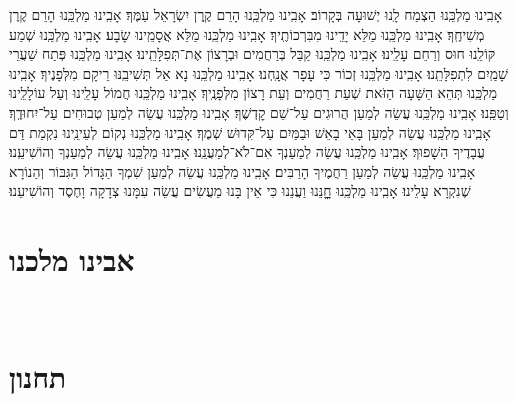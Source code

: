 \documentclass[twoside, openany, parskip=half, 11pt]{book}
\begin{document}
{אָבִֽינוּ מַלְכֵּֽנוּ הַצְמַח לָֽנוּ יְשׁוּעָה בְּקָרוֹב׃\hfill \break
אָבִֽינוּ מַלְכֵּֽנוּ הָרֵם קֶֽרֶן יִשְׂרָאֵל עַמֶּךָ׃\hfill \break
אָבִֽינוּ מַלְכֵּֽנוּ הָרֵם קֶרֶן מְשִׁיחֶֽךָ׃\hfill \break
אָבִֽינוּ מַלְכֵּֽנוּ מַלֵּא יָדֵֽינוּ מִבִּרְכוֹתֶֽיךָ׃\hfill \break
אָבִֽינוּ מַלְכֵּֽנוּ מַלֵּא אֲסָמֵֽינוּ שָׂבָע׃\hfill \break
אָבִֽינוּ מַלְכֵּֽנוּ שְׁמַע קּוֹלֵֽנוּ חוּס וְרַחֵם עָלֵֽינוּ׃\hfill \break
אָבִֽינוּ מַלְכֵּֽנוּ קַבֵּל בְּרַחֲמִים וּבְרָצוֹן אֶת־תְּפִלָּתֵֽינוּ׃\hfill \break
אָבִֽינוּ מַלְכֵּֽנוּ פְּתַח שַׁעֲרֵי שָׁמַֽיִם לִתְפִלָּתֵֽנוּ׃\hfill \break
אָבִֽינוּ מַלְכֵּֽנוּ זְכוֹר כִּי עָפָר אֲנָֽחְנוּ׃\hfill \break
אָבִֽינוּ מַלְכֵּֽנוּ נָא אַל תְּשִׁיבֵֽנּוּ רֵיקָם מִלְּפָנֶיךָ׃\hfill \break
אָבִֽינוּ מַלְכֵּֽנוּ תְּהֵא הַשָּׁעָה הַזֹּאת שְׁעַת רַחֲמִים וְעֵת רָצוֹן מִלְּפָנֶֽיךָ׃\hfill \break
אָבִֽינוּ מַלְכֵּֽנוּ חֲמוֹל עָלֵֽינוּ וְעַל עוֹלָלֵֽינוּ וְטַפֵּֽנוּ׃\hfill \break
אָבִֽינוּ מַלְכֵּֽנוּ עֲשֵׂה לְמַעַן הֲרוּגִים עַל־שֵׁם קׇדְשֶׁךָ׃\hfill \break
אָבִֽינוּ מַלְכֵּֽנוּ עֲשֵׂה לְמַעַן טְבוּחִים עַל־יִחוּדֶֽךָ׃\hfill \break
אָבִֽינוּ מַלְכֵּֽנוּ עֲשֵׂה לְמַעַן בָּאֵי בָאֵשׁ וּבַמַּיִם עַל־קִּדוּשׁ שְׁמֶךָ׃\hfill \break
אָבִֽינוּ מַלְכֵּֽנוּ נְקוֹם לְעֵינֵֽינוּ נִקְמַת דַּם עֲבָדֶיךָ הַשָׁפוּךְ׃\hfill \break
אָבִֽינוּ מַלְכֵּֽנוּ עֲשֵׂה לְמַעַנְךָ אִם־לֹא־לְמַעֲנֵֽנוּ׃\hfill \break
אָבִֽינוּ מַלְכֵּֽנוּ עֲשֵׂה לְמַעַנְךָ וְהוֹשִׁיעֵֽנוּ׃\hfill \break
אָבִֽינוּ מַלְכֵּֽנוּ עֲשֵׂה לְמַעַן רַחֲמֶיךָ הָרַבִּים׃\hfill \break
אָבִֽינוּ מַלְכֵּֽנוּ עֲשֵׂה לְמַעַן שִׁמְךָ הַגָּדוֹל הַגִּבּוֹר וְהַנוֹרָא שֶׁנִקְרָא עָלֵינוּ׃\hfill \break
אָבִֽינוּ מַלְכֵּֽנוּ חׇׇׇׇנֵּנוּ וַעֲנֵנוּ כִּי אֵין בָּנוּ מַעֲשִׂים עֲשֵׂה עִמָּנוּ צְדָקָה וָחֶסֶד וְהוֹשִׁיעֵנוּ׃

}

\section[אבינו מלכנו]{ אבינו מלכנו }
\label{avinu malkeinu}


\avinumalkeinu

\vfill
{}\\
\section[תחנון]{ תחנון }
\label{tachanun mon thurs}
\end{document}
